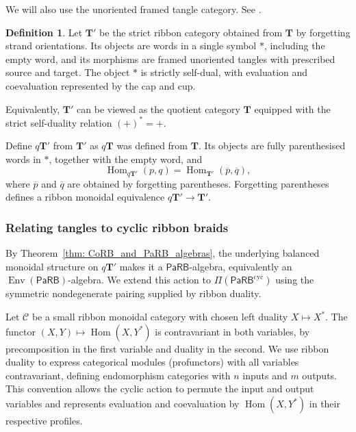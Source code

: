 \documentclass{amsart}
\newcommand{\bT}{\mathbf{T}}
\newcommand{\calC}{\mathcal{C}}
\newcommand{\PaRB}{\mathsf{PaRB}}
\newcommand{\Hom}{\operatorname{Hom}}
\newcommand{\Env}{\operatorname{Env}}
\theoremstyle{definition}
\newtheorem{definition}[theorem]{Definition}%
\numberwithin{equation}{section}
\begin{document}
We will also use the unoriented framed tangle category. See
\cite[Remark~4.1 and Section~8.2]{mousaaid2021affinization}.

\begin{definition}
\label{def: self-dual tangle category}
Let $\bT'$ be the strict ribbon category obtained from $\bT$
by forgetting strand orientations. Its objects are words in
a single symbol $*$, including the empty word, and its
morphisms are framed unoriented tangles with prescribed source
and target. The object $*$ is strictly self-dual, with
evaluation and coevaluation represented by the cap and cup.
\end{definition}

Equivalently, $\bT'$ can be viewed as the quotient category $\bT$ equipped with the strict self-duality relation $(+)^* = +$.

Define $q\bT'$ from $\bT'$ as $q\bT$ was defined from $\bT$.
Its objects are fully parenthesised words in $*$, together
with the empty word, and
\[
\Hom_{q\bT'}(p,q)
=
\Hom_{\bT'}(\overline p,\overline q),
\]
where $\overline p$ and $\overline q$ are obtained by
forgetting parentheses. Forgetting parentheses defines a
ribbon monoidal equivalence $q\bT'\to\bT'$.

\subsubsection{Relating tangles to cyclic ribbon braids}

By Theorem~\ref{thm: CoRB_and_PaRB_algebras}, the underlying
balanced monoidal structure on $q\bT'$ makes it a $\PaRB$-algebra,
equivalently an $\Env(\PaRB)$-algebra. We extend this action to
$\Pi(\PaRB^{\mathrm{cyc}})$ using the symmetric nondegenerate
pairing supplied by ribbon duality.

Let $\calC$ be a small ribbon monoidal category with chosen left
duality $X\mapsto X^*$. The functor
$(X,Y)\mapsto\Hom(X,Y^*)$ is contravariant in both variables,
by precomposition in the first variable and duality in the second.
We use ribbon duality to express categorical modules
(profunctors) with all variables contravariant, defining
endomorphism categories with $n$ inputs and $m$ outputs.
This convention allows the cyclic action to permute the input
and output variables and represents evaluation and coevaluation
by $\Hom(X,Y^*)$ in their respective profiles.
\end{document}
